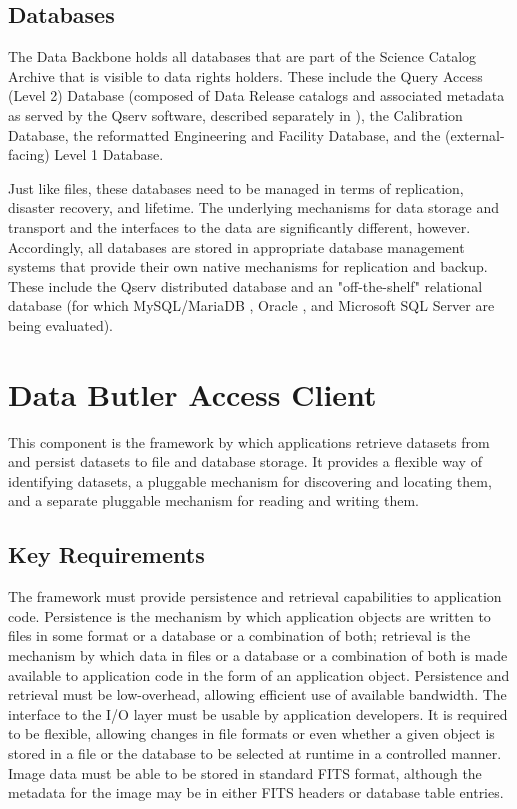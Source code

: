 \documentclass[DM,lsstdraft,toc]{lsstdoc}
\begin{document}
\subsection{Databases}\label{dbb-databases}

The Data Backbone holds all databases that are part of the Science Catalog
Archive that is visible to data rights holders.  These include the Query Access
(Level 2) Database (composed of Data Release catalogs and associated metadata
as served by the Qserv software, described separately in ), the
Calibration Database, the reformatted Engineering and Facility Database, and
the (external-facing) Level 1 Database.

Just like files, these databases need to be managed in terms of replication,
disaster recovery, and lifetime.  The underlying mechanisms for data storage
and transport and the interfaces to the data are significantly different,
however.  Accordingly, all databases are stored in appropriate database
management systems that provide their own native mechanisms for replication and
backup.  These include the Qserv distributed database and an "off-the-shelf"
relational database (for which MySQL/MariaDB \citep{MariaDB}, Oracle
\citep{Oracle}, and Microsoft SQL Server \citep{SQLServer} are being
evaluated).


\section{Data Butler Access Client}\label{data-butler-access-client}

This component is the framework by which applications retrieve datasets from
and persist datasets to file and database storage.  It provides a flexible way
of identifying datasets, a pluggable mechanism for discovering and locating
them, and a separate pluggable mechanism for reading and writing them.

\subsection{Key Requirements}\label{butler-requirements}

The framework must provide persistence and retrieval capabilities to
application code. Persistence is the mechanism by which application
objects are written to files in some format or a database or a
combination of both; retrieval is the mechanism by which data in files
or a database or a combination of both is made available to application
code in the form of an application object. Persistence and retrieval
must be low-overhead, allowing efficient use of available bandwidth. The
interface to the I/O layer must be usable by application developers. It
is required to be flexible, allowing changes in file formats or even
whether a given object is stored in a file or the database to be
selected at runtime in a controlled manner. Image data must be able to
be stored in standard FITS format, although the metadata for the image
may be in either FITS headers or database table entries.
\end{document}
